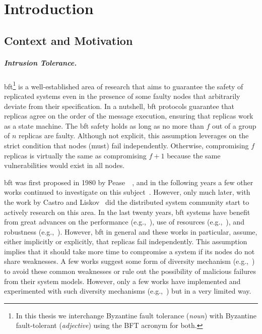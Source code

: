 \chapter{Introduction}
\label{chap:introduction}

\section{Context and Motivation}
\paragraph{Intrusion Tolerance.}
\gls{bft}\footnote{In this thesis we interchange Byzantine fault tolerance (\emph{noun}) with Byzantine fault-tolerant (\emph{adjective}) using the BFT acronym for both.} is a well-established area of research that aims to guarantee the safety of replicated systems even in the presence of some faulty nodes that arbitrarily deviate from their specification.
In a nutshell, \gls{bft} protocols guarantee that replicas agree on the order of the message execution, ensuring that replicas work as a state machine.
The \gls{bft} safety holds as long as no more than $f$ out of a group of $n$ replicas are faulty.
Although not explicit, this assumption leverages on the strict condition that nodes (must) fail independently.
Otherwise, compromising $f$ replicas is virtually the same as compromising $f+1$ because the same vulnerabilities would exist in all nodes.


\gls{bft} was first proposed in 1980 by Pease~\etal{}~\cite{Pease:1980}, and in the following years a few other works continued to investigate on this subject~\cite{Reiter:1994,Kihlstrom:1998}.
However, only much later, with the work by Castro and Liskov~\cite{Castro:1999} did the distributed system community start to actively research on this area.
In the last twenty years, \gls{bft} systems have benefit from great advances on the performance (e.g.,~\cite{Kotla:2010,Aublin:2015,Behl:2015}), use of resources (e.g.,~\cite{Yin:2003,Wood:2011,Veronese:2013,Liu:2016,Behl:2017}), and robustness (e.g.,~\cite{Amir:2011,Bessani:2014,Clement:2009b}).
However, \gls{bft} in general and these works in particular, assume, either implicitly or explicitly, that replicas fail independently. 
This assumption implies that it should take more time to compromise a system if its nodes do not share weaknesses. 
A few works suggest some form of diversity mechanism (e.g.,~\cite{Roeder:2010,Avizienis:1995}) to avoid these common weaknesses or rule out the possibility of malicious failures from their system models.
However, only a few works have implemented and experimented with such diversity mechanisms (e.g.,~\cite{Castro:2003,Roeder:2010,Amir:2011}) but in a very limited way.


